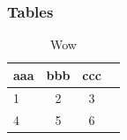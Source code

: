 \documentclass{beamer}
\begin{document}
\begin{frame}
\frametitle{Tables}
\begin{table}
\begin{tabular}{l |c|c|c|}
aaa & bbb & ccc \\
\hline \hline
1 & 2 & 3 \\
4 & 5 & 6
\end{tabular}
\caption{Wow}
\end{table}
\end{frame}
\end{document}
